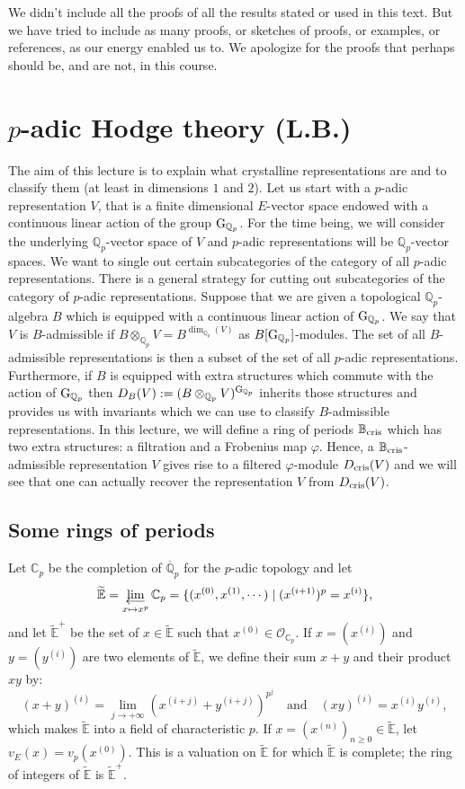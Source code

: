 \documentclass[11pt]{amsart}
\def\limproj{\mathop{\oalign{{\rm lim}\cr 
\hidewidth$\longleftarrow$\hidewidth\cr}}}
\def\Q{{\mathbb Q}_p}
\def\g{{\rm G}_{\Q}}
\def\ra{\rightarrow}
\def\Qp{{\mathbb Q}_p}
\def\Cp{\mathbb{C}_p}
\def\OO{\mathcal{O}}
\def\et{\widetilde{\mathbb{E}}}
\def\etplus{\widetilde{\mathbb{E}}^+}
\def\bcris{\mathbb{B}_{\rm cris}}
\def\dcris{D_{\rm cris}}
\begin{document}
 
We didn't include all the proofs of all the results stated or used in
this text. But we have tried to include as many proofs, or sketches of
proofs, or examples, or references, as our energy enabled us to. We
apologize for the proofs that perhaps should be, and are not, in this
course. 

 
\section{$p$-adic Hodge theory (L.B.)}\label{LB2} 
The aim of this lecture is to explain what crystalline representations 
are and to classify them (at least in dimensions $1$ and $2$). 
Let us start with 
a $p$-adic representation $V$, that is a finite dimensional $E$-vector 
space endowed with a continuous linear action of the group $\g$.  
For the time being, we will consider the underlying $\Q$-vector  
space of $V$ and $p$-adic representations will be $\Q$-vector spaces. We 
want to single out certain subcategories of the category of all 
$p$-adic representations. There is a general 
strategy for cutting out subcategories of the category of $p$-adic 
representations. Suppose that we are given a topological $\Q$-algebra 
$B$ which is equipped with a continuous linear action of $\g$. We say 
that $V$ is $B$-admissible if $B \otimes_{\Q} V = B^{\dim_{\Q}(V)}$ as 
$B[\g]$-modules. The set of all $B$-admissible representations is then 
a subset of the set of all $p$-adic representations. Furthermore, if 
$B$ is equipped with extra structures which commute with the action of 
$\g$ then $D_B(V):=(B \otimes_{\Q} V)^{\g}$ inherits those structures 
and provides us with invariants which we can use to classify 
$B$-admissible representations.  
In this lecture, we will define a 
ring of periods $\bcris$ which has two extra structures: a 
filtration and a Frobenius map $\varphi$. Hence, a 
$\bcris$-admissible representation $V$ gives rise to a filtered 
$\varphi$-module $\dcris(V)$ and we will see that one can  
actually recover the representation $V$ from $\dcris(V)$. 
 
\subsection{Some rings of periods} 
Let $\Cp$ be the completion of $\overline\Qp$  
for the $p$-adic topology and let 
\[ \et=\limproj_{x\mapsto x^p} \Cp  
=\{ (x^{(0)},x^{(1)},\cdots) \mid (x^{(i+1)})^p = x^{(i)} \}, \] 
and let $\etplus$ be the set of $x \in \et$  
such that $x^{(0)} \in  \OO_{\Cp}$.  
If $x=(x^{(i)})$ and $y=(y^{(i)})$ are two elements of $\et$, 
we define their sum $x+y$ and their product $xy$ by: 
\[ (x+y)^{(i)}= \lim_{j \ra + \infty} (x^{(i+j)}+y^{(i+j)})^{p^j}  
\quad\text{and}\quad 
(xy)^{(i)}=x^{(i)}y^{(i)}, \] which  
makes $\et$ into a field of 
characteristic $p$. If $x=(x^{(n)})_{n \geq 0}  
\in \et$, let $v_E(x)=v_p(x^{(0)})$. 
This is a valuation on $\et$ for which $\et$ is  
complete; the ring of integers of $\et$ is 
$\etplus$.  
 
\end{document}
